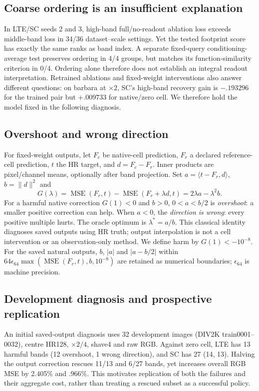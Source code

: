\subsection{Coarse ordering is an insufficient explanation}
In LTE/SC seeds 2 and 3, high-band full/no-readout ablation loss
exceeds middle-band loss in 34/36 dataset--scale settings. Yet the tested
footprint score has exactly the same ranks as band index. A separate
fixed-query conditioning-average test preserves ordering in 4/4 groups,
but matches its function-similarity criterion in 0/4. Ordering alone
therefore does not establish an integral readout interpretation.
Retrained ablations and fixed-weight interventions also answer different
questions: on barbara at $\times2$, SC's high-band recovery gain is
$-.193296$ for the trained pair but $+.009733$ for native/zero cell.
We therefore hold the model fixed in the following diagnosis.

\subsection{Overshoot and wrong direction}
For fixed-weight outputs, let $F_c$ be native-cell prediction, $F_r$
a declared reference-cell prediction, $t$ the HR target, and $d=F_c-F_r$. Inner products
are pixel/channel means, optionally after band projection. Set
$a=\langle t-F_r,d\rangle$, $b=\|d\|^2$ and
\begin{equation}
 G(\lambda)=\operatorname{MSE}(F_r,t)-\operatorname{MSE}(F_r+\lambda d,t)
             =2\lambda a-\lambda^2b.
 \label{eq:gain}
\end{equation}
For a harmful native correction $G(1)<0$ and $b>0$, $0<a<b/2$ is
\emph{overshoot}: a smaller positive correction can help. When $a<0$,
the \emph{direction is wrong}: every positive multiple hurts. The oracle
optimum is $\lambda^*=a/b$. This classical identity diagnoses saved
outputs using HR truth; output interpolation is not a cell intervention
or an observation-only method. We define harm by $G(1)<-10^{-8}$. For the saved natural outputs,
$b$, $|a|$ and $|a-b/2|$ within
$64\epsilon_{64}\max(\operatorname{MSE}(F_r,t),b,10^{-8})$
are retained as numerical boundaries; $\epsilon_{64}$ is machine precision.

\subsection{Development diagnosis and prospective replication}
An initial saved-output diagnosis uses 32 development images (DIV2K
train0001--0032), centre HR128, $\times2/4$, shave4 and raw RGB.
Against zero cell, LTE has 13 harmful bands (12 overshoot, 1 wrong
 direction), and SC has 27 (14, 13). Halving the output correction rescues
11/13 and 6/27 bands, yet increases overall RGB MSE by 2.405\% and
.966\%. This motivates replication of both the failures and their
aggregate cost, rather than treating a rescued subset as a successful policy.

